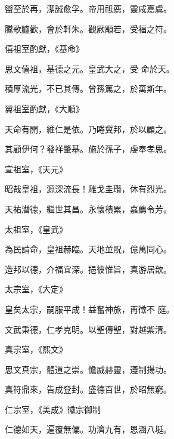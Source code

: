 \begin{pinyinscope}
 盥至於再，潔誠愈孚。帝用祗薦，靈咸嘉虞。



 騰歌臚歡，會於軒朱。觀厥顒若，受福之符。



 僖祖室酌獻，《基命》



 思文僖祖，基德之元。皇武大之，受
 命於天。



 積厚流光，不已其傳。曾孫篤之，於萬斯年。



 翼祖室酌獻，《大順》



 天命有開，維仁是依。乃睠冀邦，於以顧之。



 其顧伊何？發祥肇基。施於孫子，虔奉孝思。



 宣祖室，《天元》



 昭哉皇祖，源深流長！雕戈圭瓚，休有烈光。



 天祐潛德，繼世其昌。永懷積累，嘉薦令芳。



 太祖室，《皇武》



 為民請命，皇祖赫臨。天地並貺，億萬同心。



 造邦以德，介福宜深。挹彼惟旨，真游居歆。



 太宗室，《大定》



 皇矣太宗，嗣服平成！益奮神旅，再徵不
 庭。



 文武秉德，仁孝克明。以聖傳聖，對越紫清。



 真宗室，《熙文》



 思文真宗，體道之崇。憺威赫靈，遵制揚功。



 真符鼎來，告成登封。盛德百世，於昭無窮。



 仁宗室，《美成》徽宗御制



 仁德如天，遍覆無偏。功濟九有，恩涵八埏。




\end{pinyinscope}
